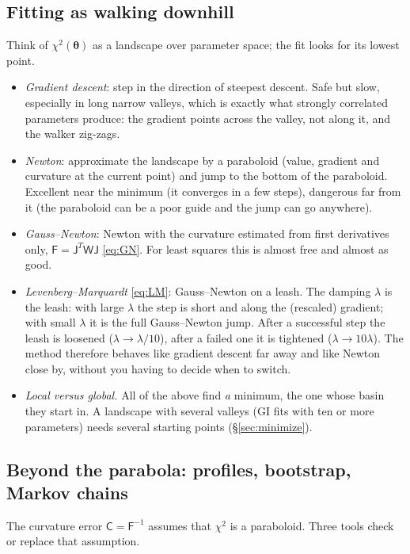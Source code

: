 \documentclass[11pt,a4paper]{article}
\numberwithin{equation}{section}
\theoremstyle{definition}
\theoremstyle{plain}
\theoremstyle{remark}
\numberwithin{algorithm}{section}
\newcommand{\sJ}{\mathsf J}
\newcommand{\sW}{\mathsf W}
\newcommand{\sF}{\mathsf F}
\newcommand{\sC}{\mathsf C}
\newcommand{\vth}{\bm\theta}
\begin{document}
\subsection{Fitting as walking downhill}\label{sec:pr-downhill}
Think of $\chi^2(\vth)$ as a landscape over parameter space; the fit looks for its lowest point.
\begin{itemize}[leftmargin=1.3em,itemsep=3pt]
\item \emph{Gradient descent}: step in the direction of steepest descent. Safe but slow, especially in long narrow valleys, which is exactly what strongly correlated parameters produce: the gradient points across the valley, not along it, and the walker zig-zags.
\item \emph{Newton}: approximate the landscape by a paraboloid (value, gradient and curvature at the current point) and jump to the bottom of the paraboloid. Excellent near the minimum (it converges in a few steps), dangerous far from it (the paraboloid can be a poor guide and the jump can go anywhere).
\item \emph{Gauss--Newton}: Newton with the curvature estimated from first derivatives only, $\sF=\sJ^T\sW\sJ$ \eqref{eq:GN}. For least squares this is almost free and almost as good.
\item \emph{Levenberg--Marquardt} \eqref{eq:LM}: Gauss--Newton on a leash. The damping $\lambda$ is the leash: with large $\lambda$ the step is short and along the (rescaled) gradient; with small $\lambda$ it is the full Gauss--Newton jump. After a successful step the leash is loosened ($\lambda\to\lambda/10$), after a failed one it is tightened ($\lambda\to10\lambda$). The method therefore behaves like gradient descent far away and like Newton close by, without you having to decide when to switch.
\item \emph{Local versus global.} All of the above find \emph{a} minimum, the one whose basin they start in. A landscape with several valleys (GI fits with ten or more parameters) needs several starting points (\S\ref{sec:minimize}).
\end{itemize}

\subsection{Beyond the parabola: profiles, bootstrap, Markov chains}\label{sec:pr-beyond}
The curvature error $\sC=\sF^{-1}$ assumes that $\chi^2$ is a paraboloid. Three tools check or replace that assumption.
\end{document}
